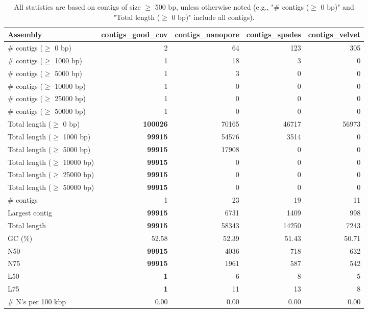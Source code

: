 \documentclass[12pt,a4paper]{article}
\begin{document}
\begin{table}[ht]
\begin{center}
\caption{All statistics are based on contigs of size $\geq$ 500 bp, unless otherwise noted (e.g., "\# contigs ($\geq$ 0 bp)" and "Total length ($\geq$ 0 bp)" include all contigs).}
\begin{tabular}{|l*{4}{|r}|}
\hline
Assembly & contigs\_good\_cov & contigs\_nanopore & contigs\_spades & contigs\_velvet \\ \hline
\# contigs ($\geq$ 0 bp) & 2 & 64 & 123 & 305 \\ \hline
\# contigs ($\geq$ 1000 bp) & 1 & 18 & 3 & 0 \\ \hline
\# contigs ($\geq$ 5000 bp) & 1 & 3 & 0 & 0 \\ \hline
\# contigs ($\geq$ 10000 bp) & 1 & 0 & 0 & 0 \\ \hline
\# contigs ($\geq$ 25000 bp) & 1 & 0 & 0 & 0 \\ \hline
\# contigs ($\geq$ 50000 bp) & 1 & 0 & 0 & 0 \\ \hline
Total length ($\geq$ 0 bp) & {\bf 100026} & 70165 & 46717 & 56973 \\ \hline
Total length ($\geq$ 1000 bp) & {\bf 99915} & 54576 & 3514 & 0 \\ \hline
Total length ($\geq$ 5000 bp) & {\bf 99915} & 17908 & 0 & 0 \\ \hline
Total length ($\geq$ 10000 bp) & {\bf 99915} & 0 & 0 & 0 \\ \hline
Total length ($\geq$ 25000 bp) & {\bf 99915} & 0 & 0 & 0 \\ \hline
Total length ($\geq$ 50000 bp) & {\bf 99915} & 0 & 0 & 0 \\ \hline
\# contigs & 1 & 23 & 19 & 11 \\ \hline
Largest contig & {\bf 99915} & 6731 & 1409 & 998 \\ \hline
Total length & {\bf 99915} & 58343 & 14250 & 7243 \\ \hline
GC (\%) & 52.58 & 52.39 & 51.43 & 50.71 \\ \hline
N50 & {\bf 99915} & 4036 & 718 & 632 \\ \hline
N75 & {\bf 99915} & 1961 & 587 & 542 \\ \hline
L50 & {\bf 1} & 6 & 8 & 5 \\ \hline
L75 & {\bf 1} & 11 & 13 & 8 \\ \hline
\# N's per 100 kbp & 0.00 & 0.00 & 0.00 & 0.00 \\ \hline
\end{tabular}
\end{center}
\end{table}
\end{document}
